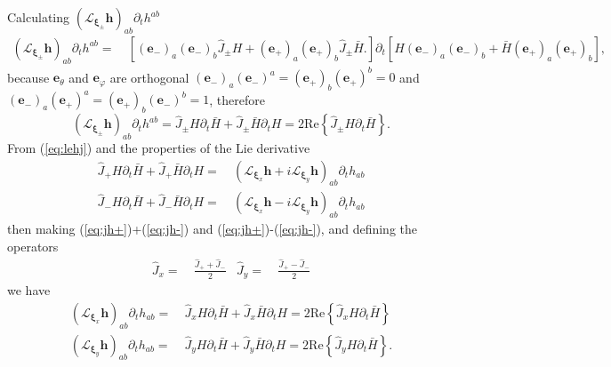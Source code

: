 Calculating $\left(\mathcal{L}_{\boldsymbol{\xi}_{\pm}}\boldsymbol{h}\right)_{ab}\partial_{t}h^{ab}$
\begin{align*}
\left(\mathcal{L}_{\boldsymbol{\xi}_{\pm}}\boldsymbol{h}\right)_{ab}\partial_{t}h^{ab}= & \ \left[\left(\boldsymbol{e}_{-}\right)_{a}\left(\boldsymbol{e}_{-}\right)_{b}\hat{J}_{\pm}H+\left(\boldsymbol{e}_{+}\right)_{a}\left(\boldsymbol{e}_{+}\right)_{b}\hat{J}_{\pm}\bar{H}.\right]\partial_{t}\left[H\left(\boldsymbol{e}_{-}\right)_{a}\left(\boldsymbol{e}_{-}\right)_{b}+\bar{H}\left(\boldsymbol{e}_{+}\right)_{a}\left(\boldsymbol{e}_{+}\right)_{b}\right],
\end{align*}
because $\boldsymbol{e}_{\theta}$ and $\boldsymbol{e}_{\varphi}$
are orthogonal $\left(\boldsymbol{e}_{-}\right)_{a}\left(\boldsymbol{e}_{-}\right)^{a}=\left(\boldsymbol{e}_{+}\right)_{b}\left(\boldsymbol{e}_{+}\right)^{b}=0$
and $\left(\boldsymbol{e}_{-}\right)_{a}\left(\boldsymbol{e}_{+}\right)^{a}=\left(\boldsymbol{e}_{+}\right)_{b}\left(\boldsymbol{e}_{-}\right)^{b}=1$,
therefore
\begin{equation}
\left(\mathcal{L}_{\boldsymbol{\xi}_{\pm}}\boldsymbol{h}\right)_{ab}\partial_{t}h^{ab}=\hat{J}_{\pm}H\partial_{t}\bar{H}+\hat{J}_{\pm}\bar{H}\partial_{t}H=2\text{Re}\left\{ \hat{J}_{\pm}H\partial_{t}\bar{H}\right\} .\label{eq:lehj}
\end{equation}
From (\ref{eq:lehj}) and the properties of the Lie derivative
\begin{align}
\hat{J}_{+}H\partial_{t}\bar{H}+\hat{J}_{+}\bar{H}\partial_{t}H= & \ \left(\mathcal{L}_{\boldsymbol{\xi}_{x}}\boldsymbol{h}+i\mathcal{L}_{\boldsymbol{\xi}_{y}}\boldsymbol{h}\right)_{ab}\partial_{t}h_{ab}\label{eq:jh+}\\
\hat{J}_{-}H\partial_{t}\bar{H}+\hat{J}_{-}\bar{H}\partial_{t}H= & \ \left(\mathcal{L}_{\boldsymbol{\xi}_{x}}\boldsymbol{h}-i\mathcal{L}_{\boldsymbol{\xi}_{y}}\boldsymbol{h}\right)_{ab}\partial_{t}h_{ab}\label{eq:jh-}
\end{align}
then making (\ref{eq:jh+})+(\ref{eq:jh-}) and (\ref{eq:jh+})-(\ref{eq:jh-}),
and defining the operators
\begin{align*}
\hat{J}_{x}= & \ \frac{\hat{J}_{+}+\hat{J}_{-}}{2} & \hat{J}_{y}= & \ \frac{\hat{J}_{+}-\hat{J}_{-}}{2}
\end{align*}
we have
\begin{align}
\left(\mathcal{L}_{\boldsymbol{\xi}_{x}}\boldsymbol{h}\right)_{ab}\partial_{t}h_{ab}= & \ \hat{J}_{x}H\partial_{t}\bar{H}+\hat{J}_{x}\bar{H}\partial_{t}H=2\text{Re}\left\{ \hat{J}_{x}H\partial_{t}\bar{H}\right\} \label{eq:jx}\\
\left(\mathcal{L}_{\boldsymbol{\xi}_{y}}\boldsymbol{h}\right)_{ab}\partial_{t}h_{ab}= & \ \hat{J}_{y}H\partial_{t}\bar{H}+\hat{J}_{y}\bar{H}\partial_{t}H=2\text{Re}\left\{ \hat{J}_{y}H\partial_{t}\bar{H}\right\} .\label{eq:jy}
\end{align}
